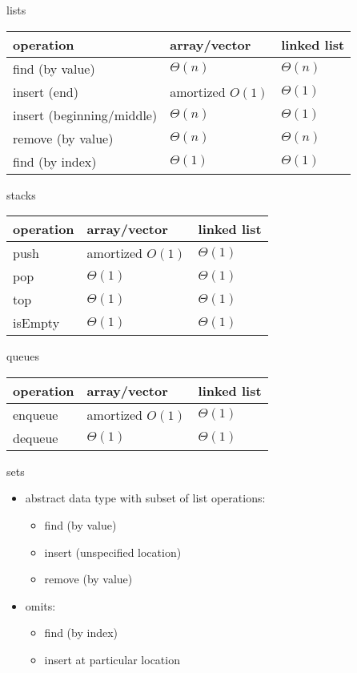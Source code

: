 \begin{frame}{lists}
\begin{tabular}{l|ll}
operation & array/vector & linked list \\ \hline
find (by value) & $\Theta(n)$ & $\Theta(n)$ \\
insert (end) & amortized $O(1)$ & $\Theta(1)$ \\
insert (beginning/middle) & $\Theta(n)$ & $\Theta(1)$ \\
remove (by value) & $\Theta(n)$ & $\Theta(n)$ \\
find (by index) & $\Theta(1)$ & $\Theta(1)$ \\
\end{tabular}
\end{frame}

\begin{frame}{stacks}
\begin{tabular}{l|ll}
operation & array/vector & linked list \\ \hline
push & amortized $O(1)$ & $\Theta(1)$ \\
pop & $\Theta(1)$ & $\Theta(1)$ \\
top & $\Theta(1)$ & $\Theta(1)$ \\
isEmpty & $\Theta(1)$ & $\Theta(1)$ \\
\end{tabular}
\end{frame}

\begin{frame}{queues}
\begin{tabular}{l|ll}
operation & array/vector & linked list \\ \hline
enqueue & amortized $O(1)$ & $\Theta(1)$ \\
dequeue & $\Theta(1)$ & $\Theta(1)$ \\
\end{tabular}
\end{frame}

\begin{frame}{sets}
    \begin{itemize}
    \item abstract data type with subset of list operations:
        \begin{itemize}
        \item find (by value)
        \item insert (unspecified location)
        \item remove (by value)
        \end{itemize}
    \item omits:
        \begin{itemize}
        \item find (by index)
        \item insert at particular location
        \end{itemize}
    \end{itemize}
\end{frame}

